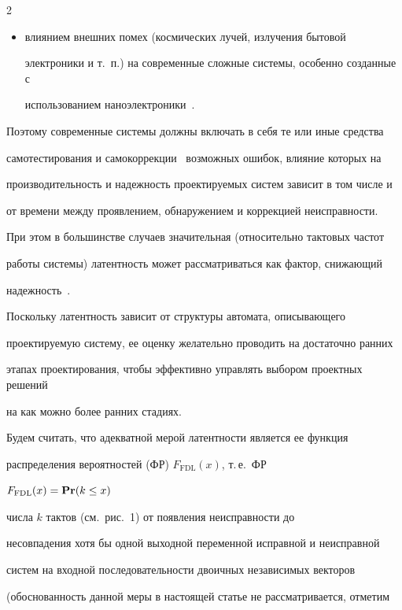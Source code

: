 \begin{multicols}{2}
\begin{itemize}
тестировании;


 \item влиянием внешних помех (космических лучей, излучения бытовой


электроники и т.\ п.) на современные сложные системы, особенно созданные с


использованием наноэлектроники~\cite{3}.


\end{itemize}


Поэтому современные системы должны включать в себя те или иные средства


самотестирования и самокоррекции~\cite{1} возможных ошибок, влияние которых на


производительность и надежность проектируемых систем зависит в том числе и


от времени между проявлением, обнаружением и коррекцией неисправности.


При этом в большинстве случаев значительная (относительно тактовых частот


работы системы) латентность может рассматриваться как фактор, снижающий


надежность~\cite{13, 12}.





 Поскольку латентность зависит от структуры автомата, опи\-сы\-ва\-юще\-го


проектируемую систему, ее оценку желательно проводить на достаточно ранних


этапах проектирования, чтобы эффективно управлять выбором проектных решений


на как можно более ранних стадиях.





 Будем считать, что адекватной мерой ла\-тент\-ности является ее функция


распределения вероятностей (ФР) $F_{\mathrm{FDL}}(x)$, т.\,е.\ ФР


$F_{\mathrm{FDL}}(x)={\bf Pr}(k\le x)$


числа $k$ тактов (см.\ рис.~1) от появления неисправности до


несовпадения хотя бы одной выходной переменной исправной и неисправной


систем на входной последовательности двоичных независимых векторов


(обоснованность данной меры в настоящей статье не рассматривается, отметим



\end{multicols}
